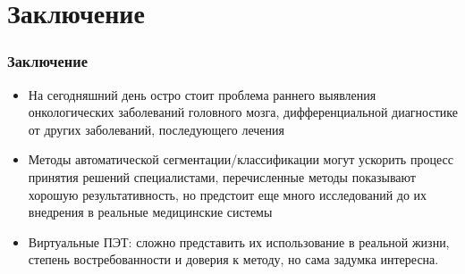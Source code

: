 
\section{Заключение}

\begin{frame}
    \frametitle{Заключение}
    \begin{itemize}
        \item На сегодняшний день остро стоит проблема раннего выявления онкологических заболеваний 
        головного мозга, дифференциальной диагностике от других заболеваний, последующего лечения

        \item Методы автоматической сегментации/классификации могут ускорить процесс принятия 
        решений специалистами, перечисленные методы показывают хорошую результативность, но предстоит еще 
        много исследований до их внедрения в реальные медицинские системы
        
        
        \item Виртуальные ПЭТ: сложно представить
        их использование в реальной жизни, степень востребованности и доверия к
        методу, но сама задумка интересна.
    \end{itemize}
\end{frame}


\begin{frame}
    \begin{center}
    \end{center}
\end{frame}